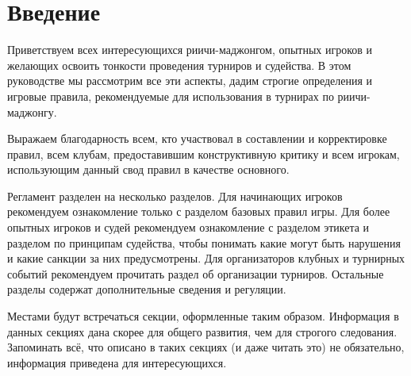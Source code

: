\section{Введение}

Приветствуем всех интересующихся риичи-маджонгом, опытных игроков и желающих освоить тонкости проведения турниров и судейства. В этом руководстве мы рассмотрим все эти аспекты, дадим строгие определения и игровые правила, рекомендуемые для использования в турнирах по риичи-маджонгу.

Выражаем благодарность всем, кто участвовал в составлении и корректировке правил, всем клубам, предоставившим конструктивную критику и всем игрокам, использующим данный свод правил в качестве основного.

Регламент разделен на несколько разделов. Для начинающих игроков рекомендуем ознакомление только с разделом базовых правил игры. Для более опытных игроков и судей рекомендуем ознакомление с разделом этикета и разделом по принципам судейства, чтобы понимать какие могут быть нарушения и какие санкции за них предусмотрены. Для организаторов клубных и турнирных событий рекомендуем прочитать раздел об организации турниров. Остальные разделы содержат дополнительные сведения и регуляции.

\begin{additional}
	
	Местами будут встречаться секции, оформленные таким образом. Информация в данных секциях дана скорее для общего развития, чем для строгого следования. Запоминать всё, что описано в таких секциях (и даже читать это) не обязательно, информация приведена для интересующихся.
\end{additional}